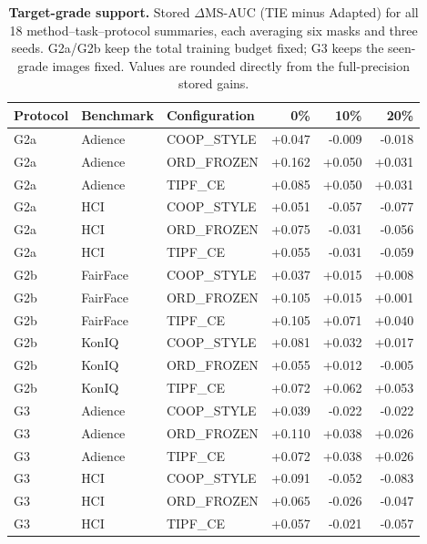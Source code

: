 \begin{table}[t]
\centering
\caption{\textbf{Target-grade support.} Stored $\Delta$MS-AUC (TIE minus Adapted) for all 18 method--task--protocol summaries, each averaging six masks and three seeds. G2a/G2b keep the total training budget fixed; G3 keeps the seen-grade images fixed. Values are rounded directly from the full-precision stored gains.}
\label{tab:supp_support}
\footnotesize
\setlength{\tabcolsep}{4pt}
\begin{tabular*}{\textwidth}{@{\extracolsep{\fill}}lllrrr@{}}
\toprule
Protocol & Benchmark & Configuration & 0\% & 10\% & 20\% \\
\midrule
G2a & Adience & COOP\_STYLE & +0.047 & -0.009 & -0.018 \\
G2a & Adience & ORD\_FROZEN & +0.162 & +0.050 & +0.031 \\
G2a & Adience & TIPF\_CE & +0.085 & +0.050 & +0.031 \\
G2a & HCI & COOP\_STYLE & +0.051 & -0.057 & -0.077 \\
G2a & HCI & ORD\_FROZEN & +0.075 & -0.031 & -0.056 \\
G2a & HCI & TIPF\_CE & +0.055 & -0.031 & -0.059 \\
G2b & FairFace & COOP\_STYLE & +0.037 & +0.015 & +0.008 \\
G2b & FairFace & ORD\_FROZEN & +0.105 & +0.015 & +0.001 \\
G2b & FairFace & TIPF\_CE & +0.105 & +0.071 & +0.040 \\
G2b & KonIQ & COOP\_STYLE & +0.081 & +0.032 & +0.017 \\
G2b & KonIQ & ORD\_FROZEN & +0.055 & +0.012 & -0.005 \\
G2b & KonIQ & TIPF\_CE & +0.072 & +0.062 & +0.053 \\
G3 & Adience & COOP\_STYLE & +0.039 & -0.022 & -0.022 \\
G3 & Adience & ORD\_FROZEN & +0.110 & +0.038 & +0.026 \\
G3 & Adience & TIPF\_CE & +0.072 & +0.038 & +0.026 \\
G3 & HCI & COOP\_STYLE & +0.091 & -0.052 & -0.083 \\
G3 & HCI & ORD\_FROZEN & +0.065 & -0.026 & -0.047 \\
G3 & HCI & TIPF\_CE & +0.057 & -0.021 & -0.057 \\
\bottomrule
\end{tabular*}
\end{table}
